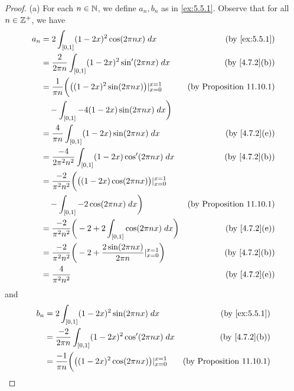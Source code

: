 \begin{proof}{(a)}
  For each \(n \in \mathbb{N}\), we define \(a_n, b_n\) as in \cref{ex:5.5.1}.
  Observe that for all \(n \in \mathbb{Z}^+\), we have
  \begin{align*}
    a_n & = 2 \int_{[0, 1]} (1 - 2x)^2 \cos(2 \pi n x) \; dx                                         & \text{(by \cref{ex:5.5.1})}     \\
        & = \frac{2}{2 \pi n} \int_{[0, 1]} (1 - 2x)^2 \sin'(2 \pi n x) \; dx                        & \text{(by \cref{4.7.2}(b))}     \\
        & = \frac{1}{\pi n} \bigg(\big((1 - 2x)^2 \sin(2 \pi n x)\big)|_{x = 0}^{x = 1}              & \text{(by Proposition 11.10.1)} \\
        & \quad - \int_{[0, 1]} -4 (1 - 2x) \sin(2 \pi n x) \; dx\bigg)                                                                \\
        & = \frac{4}{\pi n} \int_{[0, 1]} (1 - 2x) \sin(2 \pi n x) \; dx                             & \text{(by \cref{4.7.2}(e))}     \\
        & = \frac{-4}{2 \pi^2 n^2} \int_{[0, 1]} (1 - 2x) \cos'(2 \pi n x) \; dx                     & \text{(by \cref{4.7.2}(b))}     \\
        & = \frac{-2}{\pi^2 n^2} \bigg(\big((1 - 2x) \cos(2 \pi n x)\big)|_{x = 0}^{x = 1}                                             \\
        & \quad - \int_{[0, 1]} -2 \cos(2 \pi n x) \; dx\bigg)                                       & \text{(by Proposition 11.10.1)} \\
        & = \frac{-2}{\pi^2 n^2} \bigg(-2 + 2 \int_{[0, 1]} \cos(2 \pi n x) \; dx\bigg)              & \text{(by \cref{4.7.2}(e))}     \\
        & = \frac{-2}{\pi^2 n^2} \bigg(-2 + \frac{2 \sin(2 \pi n x)}{2 \pi n}|_{x = 0}^{x = 1}\bigg) & \text{(by \cref{4.7.2}(b))}     \\
        & = \frac{4}{\pi^2 n^2}                                                                      & \text{(by \cref{4.7.2}(e))}
  \end{align*}
  and
  \begin{align*}
    b_n & = 2 \int_{[0, 1]} (1 - 2x)^2 \sin(2 \pi n x) \; dx                               & \text{(by \cref{ex:5.5.1})}     \\
        & = \frac{-2}{2 \pi n} \int_{[0, 1]} (1 - 2x)^2 \cos'(2 \pi n x) \; dx             & \text{(by \cref{4.7.2}(b))}     \\
        & = \frac{-1}{\pi n} \bigg(\big((1 - 2x)^2 \cos(2 \pi n x)\big)|_{x = 0}^{x = 1}   & \text{(by Proposition 11.10.1)} \\

\end{align*}
\end{proof}
